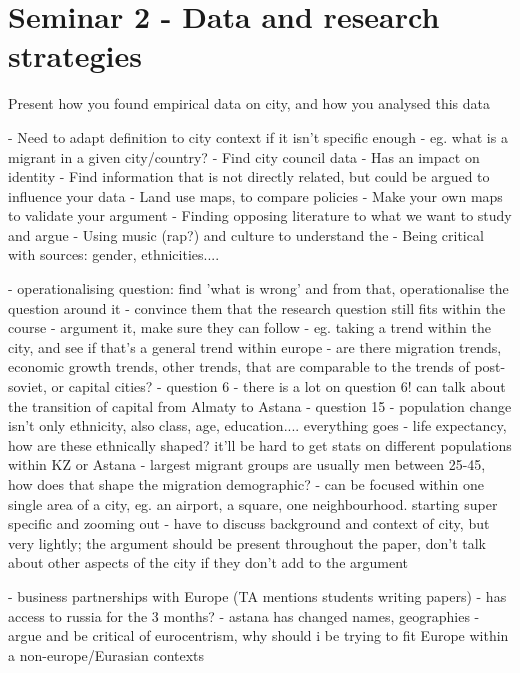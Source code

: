 \documentclass{article}
\begin{document}

\section{Seminar 2 - Data and research strategies}

\begin{outline}
	\1 Present how you found empirical data on city, and how you analysed this data
\end{outline}

- Need to adapt definition to city context if it isn't specific enough - eg. what is a migrant in a given city/country?
- Find city council data
- Has an impact on identity
- Find information that is not directly related, but could be argued to influence your data
- Land use maps, to compare policies
- Make your own maps to validate your argument
- Finding opposing literature to what we want to study and argue 
- Using music (rap?) and culture to understand the 
- Being critical with sources: gender, ethnicities.... 

- operationalising question: find 'what is wrong' and from that, operationalise the question around it
- convince them that the research question still fits within the course - argument it, make sure they can follow
- eg. taking a trend within the city, and see if that's a general trend within europe
	- are there migration trends, economic growth trends, other trends, that are comparable to the trends of post-soviet, or capital cities?
- question 6
	- there is a lot on question 6! can talk about the transition of capital from Almaty to Astana
- question 15
	- population change isn't only ethnicity, also class, age, education.... everything goes
	- life expectancy, how are these ethnically shaped? it'll be hard to get stats on different populations within KZ or Astana
	- largest migrant groups are usually men between 25-45, how does that shape the migration demographic?
- can be focused within one single area of a city, eg. an airport, a square, one neighbourhood. starting super specific and zooming out 
- have to discuss background and context of city, but very lightly; the argument should be present throughout the paper, don't talk about other aspects of the city if they don't add to the argument

- business partnerships with Europe (TA mentions students writing papers)
- has access to russia for the 3 months? 
- astana has changed names, geographies 
- argue and be critical of eurocentrism, why should i be trying to fit Europe within a non-europe/Eurasian contexts
\end{document}
